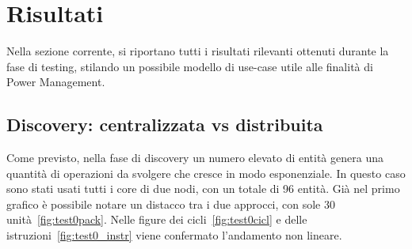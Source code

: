 \chapter{Risultati}%

Nella sezione corrente, si riportano tutti i risultati rilevanti ottenuti durante la fase di testing, stilando un possibile modello di use-case utile alle finalità di Power Management.
\section{Discovery: centralizzata vs distribuita}
Come previsto, nella fase di discovery un numero elevato di entità genera una quantità di operazioni da svolgere che cresce in modo esponenziale. In questo caso sono stati usati tutti i core di due nodi, con un totale di 96 entità.
Già nel primo grafico è possibile notare un distacco tra i due approcci, con sole 30 unità~\ref{fig:test0pack}. Nelle figure dei cicli~\ref{fig:test0cicl} e delle istruzioni~\ref{fig:test0_instr} viene confermato l'andamento non lineare.

